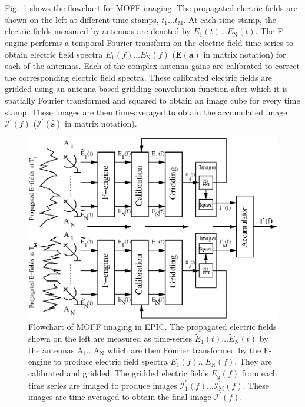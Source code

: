 \documentclass[a4paper,fleqn,usenatbib]{mnras}
\begin{document}
Fig.~\ref{fig:MOFF-flowchart} shows the flowchart for MOFF imaging. The propagated electric fields are shown on the left at different time stamps, $t_1\ldots t_\textrm{M}$. At each time stamp, the electric fields measured by antennas are denoted by $\widetilde{E}_1(t)\ldots \widetilde{E}_\textrm{N}(t)$. The F-engine performs a temporal Fourier transform on the electric field time-series to obtain electric field spectra $E_1(f)\ldots E_\textrm{N}(f)$ ($\mathbf{E}(\mathbf{a})$ in matrix notation) for each of the antennas. Each of the complex antenna gains are calibrated to correct the corresponding electric field spectra. These calibrated electric fields are gridded using an antenna-based gridding convolution function after which it is spatially Fourier transformed and squared to obtain an image cube for every time stamp. These images are then time-averaged to obtain the accumulated image $\mathcal{I}^\prime(f)$ ($\boldsymbol{\mathcal{I}^\prime}(\hat{\mathbf{s}})$ in matrix notation).

\begin{figure}
  \includegraphics[width=\columnwidth]{figure1}
  \caption{Flowchart of MOFF imaging in EPIC. The propagated electric fields shown on the left are measured as time-series $\widetilde{E}_1(t)\ldots \widetilde{E}_\textrm{N}(t)$ by the antennas $\textrm{A}_1\ldots \textrm{A}_\textrm{N}$ which are then Fourier transformed by the F-engine to produce electric field spectra $E_1(f)\ldots E_\textrm{N}(f)$. They are calibrated and gridded. The gridded electric fields $E_\textrm{g}(f)$ from each time series are imaged to produce images $\mathcal{I}^\prime_1(f)\ldots \mathcal{I}^\prime_\textrm{M}(f)$. These images are time-averaged to obtain the final image $\mathcal{I}^\prime(f)$.}
  \label{fig:MOFF-flowchart}
\end{figure}
\end{document}
